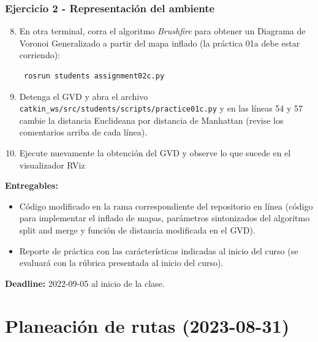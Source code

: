 \begin{frame}[containsverbatim]\frametitle{Ejercicio 2 - Representación del ambiente}
    \begin{enumerate}
    \setcounter{enumi}{7}
  \item En otra terminal, corra el algoritmo \textit{Brushfire} para obtener un Diagrama de Voronoi Generalizado a partir del mapa inflado (la práctica 01a debe estar corriendo):
\begin{verbatim}
 rosrun students assignment02c.py
\end{verbatim}

  \item Detenga el GVD y abra el archivo \texttt{catkin\_ws/src/students/scripts/practice01c.py} y en las líneas 54 y 57 cambie la distancia Euclideana por distancia de Manhattan (revise los comentarios arriba de cada línea).
  \item Ejecute nuevamente la obtención del GVD y observe lo que sucede en el visualizador RViz
  \end{enumerate}

  \textbf{Entregables:}
  \begin{itemize}
  \item Código modificado en la rama correspondiente del repositorio en línea (código para implementar el inflado de mapas, parámetros sintonizados del algoritmo split and merge y función de distancia modificada en el GVD). 
  \item Reporte de práctica con las carácterísticas indicadas al inicio del curso (se evaluará con la rúbrica presentada al inicio del curso). 
  \end{itemize}
  \textbf{Deadline: } 2022-09-05 al inicio de la clase. 
\end{frame}

\section{Planeación de rutas (2023-08-31)}

